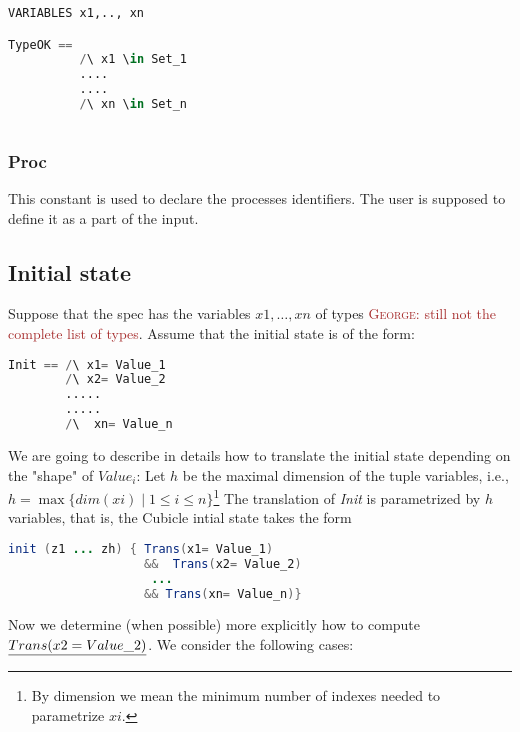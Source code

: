 \documentclass{article}
\theoremstyle{plain}
\numberwithin{equation}{section}
\newcommand{\george}[1]{\textcolor{brown}{\textsc{George: } {\sf #1}}}
\renewcommand{\leq}{\leqslant}
\begin{document}
\begin{lstlisting}[language=Python,caption={The explicit form of the predicate \emph{TypeOK}.}, label={TypeOkcodes}] 
VARIABLES x1,.., xn

TypeOK == 
          /\ x1 \in Set_1
          ....
          ....
          /\ xn \in Set_n
 
\end{lstlisting}

\subsubsection{Proc}\label{Proc} This constant is used to declare the processes identifiers. The user is supposed to define it as a part of the input. 


\subsection{Initial state} 
Suppose that the spec has the variables $x1, \dots, xn$ of types \george{still not the complete list of types}.  
Assume that the initial state is of the form: 

\begin{lstlisting}[language=Python]
Init == /\ x1= Value_1  
        /\ x2= Value_2  
        .....
        .....
        /\  xn= Value_n   
\end{lstlisting}

We are going to describe in details how to translate the initial state depending on the "shape" of $Value_i$: Let $h$ be the maximal dimension of the tuple variables, i.e., $h=\max\{dim(xi)\mid 1\leq i \leq n\}$\footnote{By dimension we mean the minimum number of indexes needed to parametrize $xi$.} The translation of \emph{Init}  is parametrized by $h$ variables, that is, the Cubicle intial state takes the form 
\begin{lstlisting}[language=java]
init (z1 ... zh) { Trans(x1= Value_1) 
                   &&  Trans(x2= Value_2) 
                    ... 
                   && Trans(xn= Value_n)}
\end{lstlisting}
  Now we determine (when possible) more explicitly  how to compute  $\emph{Trans(x2= Value\_2)}$. We consider the following cases: 
\end{document}
